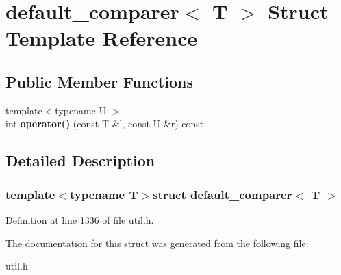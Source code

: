 \hypertarget{structdefault__comparer}{\section{default\+\_\+comparer$<$ T $>$ Struct Template Reference}
\label{structdefault__comparer}
}
\subsection*{Public Member Functions}
\begin{DoxyCompactItemize}
\item 
\hypertarget{structdefault__comparer_a744d24d37aa02d789d6bd18ad90f2cac}{{\footnotesize template$<$typename U $>$ }\\int {\bfseries operator()} (const T \&l, const U \&r) const }\label{structdefault__comparer_a744d24d37aa02d789d6bd18ad90f2cac}

\end{DoxyCompactItemize}


\subsection{Detailed Description}
\subsubsection*{template$<$typename T$>$struct default\+\_\+comparer$<$ T $>$}



Definition at line 1336 of file util.\+h.



The documentation for this struct was generated from the following file\+:\begin{DoxyCompactItemize}
\item 
util.\+h\end{DoxyCompactItemize}
